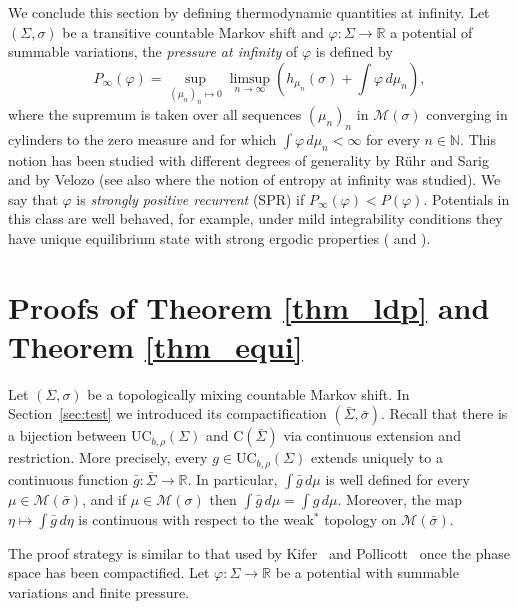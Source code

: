 \documentclass[letterpaper,11pt]{amsart}
\numberwithin{equation}{section}     %
\newcommand{\M}{\mathcal{M}}
\newcommand{\R}{\mathbb{R}}
\newcommand{\N}{\mathbb{N}}
\def\phi{\varphi}
\def\R{{\mathbb R}}
\def\N{{\mathbb N}}
\def\M{{\mathcal M}}
\def\M{\mathcal{M}}
\begin{document}
We conclude this section by defining thermodynamic quantities at infinity. Let $(\Sigma, \sigma)$ be a transitive countable Markov shift and $\phi: \Sigma \to \R$ a potential of summable variations, the \emph{pressure at infinity} of $\phi$ is defined by
\begin{equation} \label{pre_inf}
P_{\infty}(\phi)=\sup_{(\mu_n)_n \mapsto 0} \limsup_{n \to \infty} \left(h_{\mu_n}(\sigma)  + \int \phi \, d\mu_n 	\right),
\end{equation}
where the supremum is taken over all sequences $(\mu_n)_n $ in $\M(\sigma)$ converging in cylinders to  the zero measure and  for which $\int \phi \, d\mu_n <\infty$ for every $n \in \N$. This notion has been studied with different degrees of generality by  R\"uhr and Sarig \cite{sr} and by Velozo \cite{v} (see also \cite{itv} where the notion of entropy at infinity was studied).  We say that  $\phi$ is \emph{strongly positive recurrent} (SPR) if  $P_\infty(\phi)<P(\phi)$. Potentials in this class are well behaved, for example, under mild integrability conditions  they have unique equilibrium state with strong ergodic properties (\cite[Theorem 1.4]{v} and \cite[Theorem 8.2]{sr}).






\section{Proofs of Theorem \ref{thm_ldp} and Theorem \ref{thm_equi}}





Let $(\Sigma,\sigma)$ be a topologically mixing countable Markov shift. In Section~\ref{sec:test} we introduced its compactification $(\bar\Sigma,\bar\sigma)$. Recall that there is a bijection between $\text{UC}_{b,\rho}(\Sigma)$ and $\text{C}(\bar\Sigma)$ via continuous extension and restriction. More precisely, every  $g\in\text{UC}_{b,\rho}(\Sigma)$ extends uniquely to a continuous function $\bar{g}:\bar\Sigma\to\R$. In particular, $\int \bar{g} \, d\mu$ is well defined for every $\mu\in \M(\bar\sigma)$, and if $\mu\in \M(\sigma)$ then $\int \bar{g} \, d\mu=\int g \, d\mu$. Moreover, the map $\eta\mapsto \int \bar{g} \, d\eta$ is continuous with respect to the weak$^\ast$ topology on $\M(\bar\sigma)$. 

 The proof strategy is similar to that used by  Kifer~\cite{kif} and Pollicott~\cite{po} once the phase space has been compactified. Let $\phi:\Sigma\to\R$ be a potential with summable variations and finite pressure.
\end{document}
